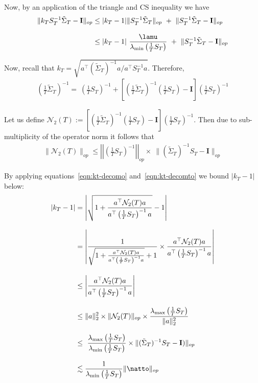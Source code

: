 \documentclass[11pt,letterpaper]{article}
\newcommand{\Id}{\mathbf{I}}
\newcommand{\PT}{\tilde{\Sigma}_T}
\newcommand{\SigPinv}{ \left(\PT \right)^{-1}}
\theoremstyle{plain}
\theoremstyle{definition}  %
\begin{document}
\newcommand{\natoto}{\mathcal{N}_2(T)}

\noindent Now, by an application of the triangle and CS inequality we have
\begin{align}\label{eqn:MTP-bdd}
\notag
    \| k_T S_T^{-1} \PT - \Id  \|_{op} 
    &\leq | k_T - 1| \| S_T^{-1} \PT\|_{op} \ + \ \| S_T^{-1} \PT - \Id \|_{op} \\[8pt]
    & \leq | k_T - 1| \ \frac{\lamu}{\lambda_{\min} \left ( \frac{1}{T}S_T \right)} 
    \ + \ \| S_T^{-1} \PT - \Id \|_{op}
\end{align}

\noindent Now, recall that  $k_T = \sqrt{ a^{\top} \SigPinv a / a^{\top} S_T^{-1} a}$. Therefore,
\begin{align}\label{eqn:kt-decomo}
    \left(\frac{1}{T} \PT \right)^{-1}
    = \ \left(\frac{1}{T} S_T \right)^{-1}
    + \left[\left(\frac{1}{T} \PT \right)^{-1}
    \left(\frac{1}{T} S_T \right) - \Id \right]
    \left(\frac{1}{T} S_T \right)^{-1}
\end{align}

\noindent Let us define $ \natoto:= \left[\left(\frac{1}{T} \PT \right)^{-1}
    \left(\frac{1}{T} S_T \right) - \Id \right]
    \left(\frac{1}{T} S_T \right)^{-1}$. Then due to sub-multiplicity of the operator norm it follows that
\begin{align}\label{eqn:kt-decomto}
    \|\natoto \|_{op}
    \leq \left| \left| \left(\frac{1}{T} S_T \right)^{-1}\right| \right|_{op} \times \ \|(\PT)^{-1} S_T - \Id \|_{op}
\end{align}

\noindent  By applying equations~\eqref{eqn:kt-decomo} and~\eqref{eqn:kt-decomto} we bound $ |k_T -1|$ below:
\begin{align}\label{eqn:kt-MT-pbdd}
\notag
     | k_T - 1 |   
    &=  \left| \sqrt{1 + \dfrac{a^{\top}\natoto a}{a^{\top} \left( \frac{1}{T} S_T \right)^{-1}a}} -1 \right| \\[8pt]\notag
    & =  \left| \dfrac{1}{ \sqrt{1 + \frac{a^{\top} \natoto a}{a^{\top} \left( \frac{1}{T} S_T \right)^{-1}a}} +1} \times   \dfrac{a^{\top} \natoto a}{a^{\top} \left( \frac{1}{T} S_T \right)^{-1}a} \right|  \\[10pt]\notag
    &\leq  \left|   \frac{a^{\top} \natoto a}{a^{\top} \left( \frac{1}{T} S_T \right)^{-1}a} \right|  \\[10pt]\notag
    & \leq \|a\|^2_2 \times \| \natoto\|_{op} \times \frac{\lambda_{\max} \left( \frac{1}{T} S_T \right)}{\| a\|^2_2} \\[8pt] \notag
    & \leq  \ \frac{\lambda_{\max} \left( \frac{1}{T} S_T \right)}{\lambda_{\min} \left( \frac{1}{T} S_T \right)} \times  \| (\PT)^{-1}S_T - \Id)\|_{op}
    \\[8pt]
    & \lesssim \frac{1}{\lambda_{\min} \left( \frac{1}{T} S_T \right)} \| \natto\|_{op}
\end{align}
\end{document}
